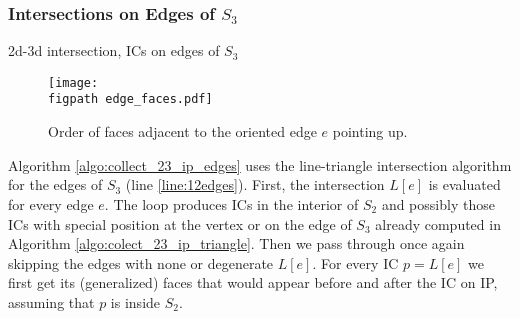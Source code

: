\documentclass{elsarticle}
\newcommand{\figpath}{figures/}
\begin{document}
\subsubsection{Intersections on Edges of $S_3$}
\label{sec:edges}
\begin{algorithm}  
  \caption{2d-3d intersection, ICs on edges of $S_3$}
  \label{algo:collect_23_ip_edges}
  
  \DontPrintSemicolon
  
    
\end{algorithm}

\begin{figure}%
  \begin{center}        
    \texttt{[image: \\figpath edge\_faces.pdf]}
  \end{center}
  \caption{Order of faces adjacent to the oriented edge $e$ pointing up.}
  \label{fig:edge_faces}
\end{figure}

Algorithm \ref{algo:collect_23_ip_edges} uses the line-triangle intersection algorithm for the edges of $S_3$ (line \ref{line:12edges}).
First, the intersection $L[e]$ is evaluated for every edge $e$. The loop produces ICs in the interior of $S_2$ and possibly those ICs with special position at the vertex or on the edge of $S_3$ already computed 
in Algorithm \ref{algo:colect_23_ip_triangle}. Then we pass through once again skipping the edges with none or degenerate $L[e]$.
For every IC $p=L[e]$ we first get its (generalized) faces that would appear before and after the IC on IP, assuming that $p$ is inside $S_2$. 
\end{document}
